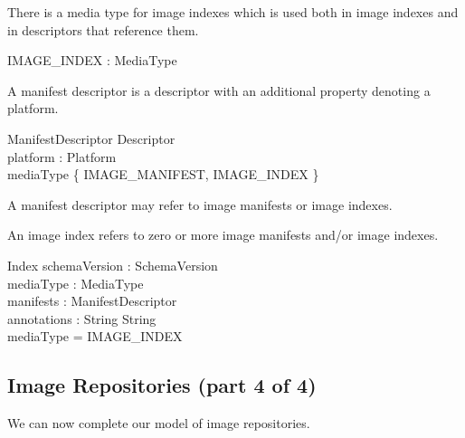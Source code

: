 \documentclass[a4paper,twoside,12pt]{article}
\begin{document}
There is a media type for image indexes which is used both in image indexes and in descriptors that reference them.
\begin{axdef}
  IMAGE\_INDEX : MediaType \\
\end{axdef}

A manifest descriptor is a descriptor with an additional property denoting a platform.
\begin{schema}{ManifestDescriptor}
  Descriptor \\
  platform : Platform \\
\where
  mediaType \in \{ IMAGE\_MANIFEST, IMAGE\_INDEX \} \\
\end{schema}
A manifest descriptor may refer to image manifests or image indexes.

An image index refers to zero or more image manifests and/or image indexes.
\begin{schema}{Index}
  schemaVersion : SchemaVersion \\
  mediaType : MediaType \\
  manifests : \seq ManifestDescriptor \\
  annotations : String \pfun String \\
\where
  mediaType = IMAGE\_INDEX \\
\end{schema}

\subsection{Image Repositories (part 4 of 4)}

We can now complete our model of image repositories.
\end{document}
